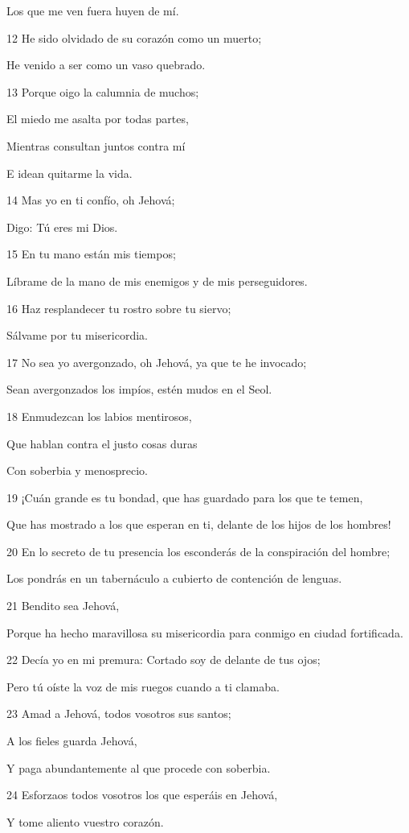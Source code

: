 \par Los que me ven fuera huyen de mí.
\par 12 He sido olvidado de su corazón como un muerto;
\par He venido a ser como un vaso quebrado.
\par 13 Porque oigo la calumnia de muchos;
\par El miedo me asalta por todas partes,
\par Mientras consultan juntos contra mí
\par E idean quitarme la vida.
\par 14 Mas yo en ti confío, oh Jehová;
\par Digo: Tú eres mi Dios.
\par 15 En tu mano están mis tiempos;
\par Líbrame de la mano de mis enemigos y de mis perseguidores.
\par 16 Haz resplandecer tu rostro sobre tu siervo;
\par Sálvame por tu misericordia.
\par 17 No sea yo avergonzado, oh Jehová, ya que te he invocado;
\par Sean avergonzados los impíos, estén mudos en el Seol.
\par 18 Enmudezcan los labios mentirosos,
\par Que hablan contra el justo cosas duras
\par Con soberbia y menosprecio.
\par 19 ¡Cuán grande es tu bondad, que has guardado para los que te temen,
\par Que has mostrado a los que esperan en ti, delante de los hijos de los hombres!
\par 20 En lo secreto de tu presencia los esconderás de la conspiración del hombre;
\par Los pondrás en un tabernáculo a cubierto de contención de lenguas.
\par 21 Bendito sea Jehová,
\par Porque ha hecho maravillosa su misericordia para conmigo en ciudad fortificada.
\par 22 Decía yo en mi premura: Cortado soy de delante de tus ojos;
\par Pero tú oíste la voz de mis ruegos cuando a ti clamaba.
\par 23 Amad a Jehová, todos vosotros sus santos;
\par A los fieles guarda Jehová,
\par Y paga abundantemente al que procede con soberbia.
\par 24 Esforzaos todos vosotros los que esperáis en Jehová,
\par Y tome aliento vuestro corazón.

